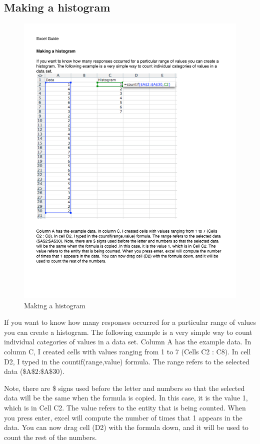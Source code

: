 \subsection{Making a histogram}

\begin{figure}
      \includegraphics[width=.7\linewidth]{LabmanualFigures/Excel13.pdf}
      \caption{Making a histogram}
      \label{fig:excel13}
\end{figure}
 


If you want to know how many responses occurred for a particular range of values you can create a histogram. The following example is a very simple way to count individual categories of values in a data set.
Column A has the example data. In column C, I created cells with values ranging from 1 to 7 (Cells C2 : C8). In cell D2, I typed in the countif(range,value) formula. The range refers to the selected data (\$A\$2:\$A\$30). 

Note, there are \$ signs used before the letter and numbers so that the selected data will be the same when the formula is copied. In this case, it is the value 1, which is in Cell C2. The value refers to the entity that is being counted. When you press enter, excel will compute the number of times that 1 appears in the data. You can now drag cell (D2) with the formula down, and it will be used to count the rest of the numbers.
 


